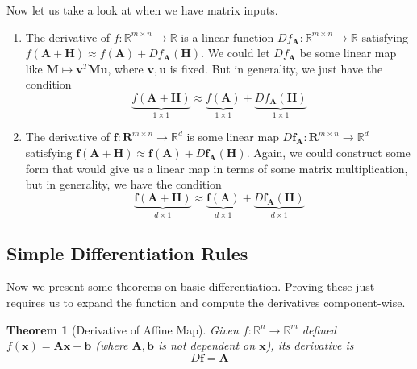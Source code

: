 \documentclass{article}
\newtheorem{theorem}{Theorem}[section]
\theoremstyle{remark}
\theoremstyle{definition}
\begin{document}
Now let us take a look at when we have matrix inputs. 
\begin{enumerate}
    \item The derivative of $f: \mathbb{R}^{m \times n} \longrightarrow \mathbb{R}$ is a linear function $D f_{\mathbf{A}} : \mathbb{R}^{m \times n} \longrightarrow \mathbb{R}$ satisfying $f(\mathbf{A} + \mathbf{H}) \approx f(\mathbf{A}) + D f_{\mathbf{A}} (\mathbf{H})$. We could let $D f_{\mathbf{A}}$ be some linear map like $\mathbf{M} \mapsto \mathbf{v}^T \mathbf{M} \mathbf{u}$, where $\mathbf{v}, \mathbf{u}$ is fixed. But in generality, we just have the condition 
    \[\underbrace{f(\mathbf{A} + \mathbf{H})}_{1 \times 1} \approx \underbrace{f(\mathbf{A})}_{1 \times 1} + \underbrace{D f_{\mathbf{A}} (\mathbf{H})}_{1 \times 1}\]
    
    \item The derivative of $\mathbf{f}: \mathbf{R}^{m \times n} \longrightarrow \mathbb{R}^d$ is some linear map $D \mathbf{f}_\mathbf{A} : \mathbf{R}^{m \times n} \longrightarrow \mathbb{R}^d$ satisfying $\mathbf{f} (\mathbf{A} + \mathbf{H}) \approx \mathbf{f}(\mathbf{A}) + D \mathbf{f}_\mathbf{A} (\mathbf{H})$. Again, we could construct some form that would give us a linear map in terms of some matrix multiplication, but in generality, we have the condition 
    \[\underbrace{\mathbf{f} (\mathbf{A} + \mathbf{H})}_{d \times 1} \approx \underbrace{\mathbf{f}(\mathbf{A})}_{d \times 1} + \underbrace{D \mathbf{f}_\mathbf{A} (\mathbf{H})}_{d \times 1}\]
\end{enumerate}

\subsection{Simple Differentiation Rules}

Now we present some theorems on basic differentiation. Proving these just requires us to expand the function and compute the derivatives component-wise. 

\begin{theorem}[Derivative of Affine Map]
Given $f: \mathbb{R}^n \longrightarrow \mathbb{R}^m$ defined $f(\mathbf{x}) = \mathbf{A} \mathbf{x} + \mathbf{b}$ (where $\mathbf{A}, \mathbf{b}$ is not dependent on $\mathbf{x}$), its derivative is 
\[D \mathbf{f} = \mathbf{A}\]
\end{theorem}
\end{document}
